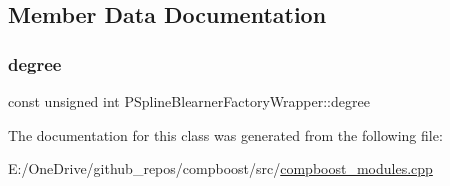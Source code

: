 \subsection{Member Data Documentation}
\mbox{\label{class_p_spline_blearner_factory_wrapper_ac19835801a7c185a7a86749c7dcfaf18}} 
\subsubsection{\texorpdfstring{degree}{degree}}
{\footnotesize\ttfamily const unsigned int P\+Spline\+Blearner\+Factory\+Wrapper\+::degree\hspace{0.3cm}{\ttfamily [private]}}



The documentation for this class was generated from the following file\+:\begin{DoxyCompactItemize}
\item 
E\+:/\+One\+Drive/github\+\_\+repos/compboost/src/\mbox{\hyperlink{compboost__modules_8cpp}{compboost\+\_\+modules.\+cpp}}\end{DoxyCompactItemize}
